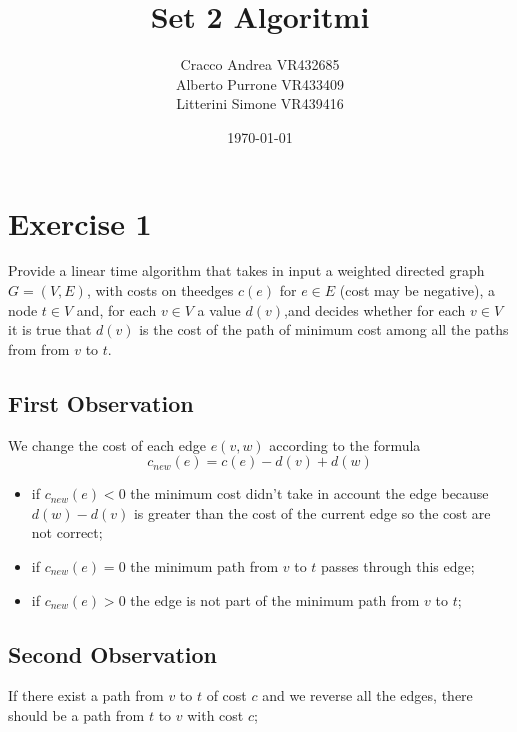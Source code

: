 \documentclass[]{article}
\begin{document}
\title{Set 2 Algoritmi}
\author{Cracco Andrea VR432685\\Alberto Purrone VR433409\\Litterini Simone VR439416\\}
\date{\today}
\maketitle




\section{Exercise 1}

Provide a linear time algorithm that takes in input a weighted directed graph $G = (V, E)$,
with costs on theedges $c(e)$ for $e∈E$ (cost may be negative), a node $t∈V$ and,
for each $v∈V$ a value $d(v)$,and decides whether for each $v ∈ V$ it is true that $d(v)$ is the
cost of the path of minimum cost among all the paths from from $v$ to $t$.

\subsection{First Observation}

We change the cost of each edge $e(v,w)$ according to the formula $$ c_{new}(e) = c(e)-d(v)+d(w)$$

\begin{itemize}

\item if $c_{new}(e)  < 0$ the minimum cost didn't take in account the edge because $d(w) - d(v)$ is greater
than the cost of the current edge so the cost are not correct;

\item if $c_{new}(e)  = 0$ the minimum path from $v$ to $t$ passes through this edge;

\item if $c_{new}(e)  > 0$ the edge is not part of the minimum path from $v$ to $t$;


\end{itemize}

\subsection{Second Observation}

If there exist a path from $v$ to $t$ of cost $c$ and we reverse all the edges, there should be a path from $t$ to $v$ with cost $c$;
\end{document}
